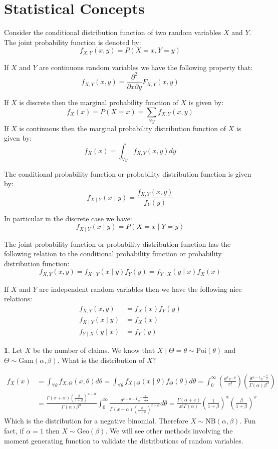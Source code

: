 \documentclass[english,12pt]{article}
\theoremstyle{plain}
\theoremstyle{definition}
\newtheorem*{example}{\protect\examplename}
\theoremstyle{definition} %
\providecommand{\examplename}{Example}
\begin{document}
\section{Statistical Concepts}
Consider the conditional distribution function of two random variables $X$ and $Y$.  The joint probability function is denoted by:
\[f_{X,Y}(x,y)=P(X=x,Y=y)\]

If $X$ and $Y$ are continuous random variables we have the following property that:
\[f_{X,Y}(x,y)=\frac{\partial^2}{\partial x\partial y}F_{X,Y}(x,y)\]

If $X$ is discrete then the marginal probability function of $X$ is given by:
\[f_X(x)=P(X=x)=\sum\limits_{\forall y}f_{X,Y}(x,y)\]
If $X$ is continuous then the marginal probability distribution function of $X$ is given by:
\[f_X(x)=\int_{\forall y}f_{X,Y}(x,y)dy\]

The conditional probability function or probability distribution function is given by:
\[f_{X\mid Y}(x\mid y)=\frac{f_{X,Y}(x,y)}{f_Y(y)}\]

In particular in the discrete case we have:
\[f_{X\mid Y}(x\mid y)=P(X=x\mid Y=y)\]

The joint probability function or probability distribution function has the following relation to the conditional probability function or probability distribution function:
\[f_{X,Y}(x,y)=f_{X\mid Y}(x\mid y)f_Y(y)=f_{Y\mid X}(y\mid x)f_X(x)\]

If $X$ and $Y$ are independent random variables then we have the following nice relations:
\begin{align*}
f_{X,Y}(x,y)&=f_X(x)f_Y(y)\\
f_{X\mid Y}(x\mid y)&=f_X(x)\\
f_{Y\mid X}(y\mid x)&=f_Y(y)
\end{align*}

\begin{example}
Let $X$ be the number of claims.  We know that $X\mid\Theta=\theta\sim \text{Poi}(\theta)$ and $\Theta\sim \text{Gam}(\alpha,\beta)$.  What is the distribution of $X$?

\begin{align*}
f_X(x)&=\int_{\forall\theta}f_{X,\Theta}(x,\theta)d\theta
=\int_{\forall\theta}f_{X\mid\Theta}(x\mid\theta)f_{\Theta}(\theta)d\theta
=\int_0^\infty\left(\frac{\theta^xe^{-\theta}}{x!}\right)\left(\frac{\theta^{\alpha-1}e^{-\frac{\theta}{\beta}}}{\Gamma(\alpha)\beta^\alpha}\right)\\
&=\frac{\Gamma(x+\alpha)\left(\frac{\beta}{1+\beta}\right)^{x+\alpha}}{\Gamma(\alpha)\beta^\alpha}\int_0^\infty \frac{\theta^{x+\alpha-1}e^{-\frac{\theta}{\frac{\beta}{1+\beta}}}}{\Gamma(x+\alpha)\left(\frac{\beta}{1+\beta}\right)^{x+\alpha}}d\theta
=\frac{\Gamma(\alpha+x)}{x!\Gamma(\alpha)}\left(\frac{1}{1+\beta}\right)^\alpha\left(\frac{\beta}{1+\beta}\right)^x
\end{align*}
Which is the distribution for a negative binomial.  Therefore $X\sim \text{NB}(\alpha,\beta)$.  Fun fact, if $\alpha=1$ then $X\sim \text{Geo}(\beta)$.  We will see other methods involving the moment generating function to validate the distributions of random variables.
\end{example}
\end{document}

